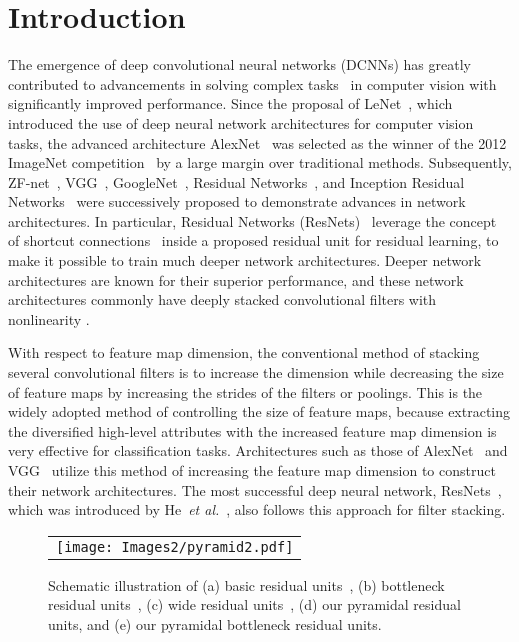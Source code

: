 \documentclass[10pt,twocolumn,letterpaper]{article}
\begin{document}
\section{Introduction}
The emergence of deep convolutional neural networks (DCNNs) has greatly contributed to advancements in solving complex tasks~\cite{alexnet, overfeat, decaf, rcnn, FCN} in computer vision with significantly improved performance. Since the proposal of LeNet~\cite{Lenet}, which introduced the use of deep neural network architectures for computer vision tasks, the advanced architecture AlexNet~\cite{alexnet} was selected as the winner of the 2012 ImageNet competition~\cite{ImageNet} by a large margin over traditional methods. Subsequently, ZF-net~\cite{zfnet}, VGG~\cite{VGG}, GoogleNet~\cite{GoogleNet}, Residual Networks~\cite{resnet, preresnet}, and Inception Residual Networks~\cite{InceptionResnet} were successively proposed to demonstrate advances in network architectures. In particular, Residual Networks (ResNets)~\cite{resnet, preresnet} leverage the concept of shortcut connections~\cite{Highway} inside a proposed residual unit for residual learning, to make it possible to train much deeper network architectures. Deeper network architectures are known for their superior performance, and these network architectures commonly have deeply stacked convolutional filters with nonlinearity \cite{VGG,GoogleNet}.

With respect to feature map dimension, the conventional method of stacking several convolutional filters is to increase the dimension while decreasing the size of feature maps by increasing the strides of the filters or poolings. This is the widely adopted method of controlling the size of feature maps, because extracting the diversified high-level attributes with the increased feature map dimension is very effective for classification tasks. Architectures such as those of AlexNet~\cite{alexnet} and VGG~\cite{VGG} utilize this method of increasing the feature map dimension to construct their network architectures. The most successful deep neural network, ResNets~\cite{resnet,preresnet}, which was introduced by He~\textit{et al.}~\cite{resnet}, also follows this approach for filter stacking.


\begin{figure*}[ht]
\small
\centering
\begin{tabular}{c}
\texttt{[image: Images2/pyramid2.pdf]}
\end{tabular}
\caption{Schematic illustration of (a) basic residual units~\cite{resnet}, (b) bottleneck residual units~\cite{resnet}, (c) wide residual units~\cite{wideresnet}, (d) our pyramidal residual units, and (e) our pyramidal bottleneck residual units.}
\label{fig:pyramid}
\end{figure*}
\end{document}
